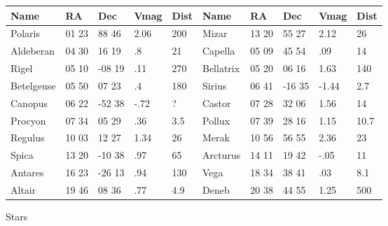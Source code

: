 \begin{figure} [h]
\begin{center}
\begin{tabular} {|lllll|lllll|}
\hline
{\bf Name} & {\bf RA} & {\bf Dec} & {\bf Vmag} & {\bf Dist} & {\bf Name} & {\bf RA} & {\bf Dec} & {\bf Vmag} & {\bf Dist} \\
\hline
Polaris & 01 23 & 88 46 & 2.06 & 200 & Mizar & 13 20 & 55 27 & 2.12 & 26 \\
\hline
Aldeberan & 04 30 & 16 19 & .8 & 21 & Capella & 05 09 & 45 54 & .09 & 14 \\
\hline
Rigel & 05 10 & -08 19 & .11 & 270 & Bellatrix & 05 20 & 06 16 & 1.63 & 140 \\
\hline
Betelgeuse & 05 50 & 07 23 & .4 & 180 & Sirius & 06 41 & -16 35 & -1.44 & 2.7 \\
\hline
Canopus & 06 22 & -52 38 & -.72 & ? & Castor & 07 28 & 32 06 & 1.56 & 14 \\
\hline
Procyon & 07 34 & 05 29 & .36 & 3.5 & Pollux & 07 39 & 28 16 & 1.15 & 10.7 \\
\hline
Regulus & 10 03 & 12 27 & 1.34 & 26 & Merak & 10 56 & 56 55 & 2.36 & 23 \\
\hline
Spica & 13 20 & -10 38 & .97 & 65 & Arcturus & 14 11 & 19 42 & -.05 & 11 \\
\hline
Antares & 16 23 & -26 13 & .94 & 130 & Vega & 18 34 & 38 41 & .03 & 8.1 \\
\hline
Altair & 19 46 & 08 36 & .77 & 4.9 & Deneb & 20 38 & 44 55 & 1.25 & 500\\
\hline
\end{tabular}
\end{center}
\caption{Stars}
\end{figure}
